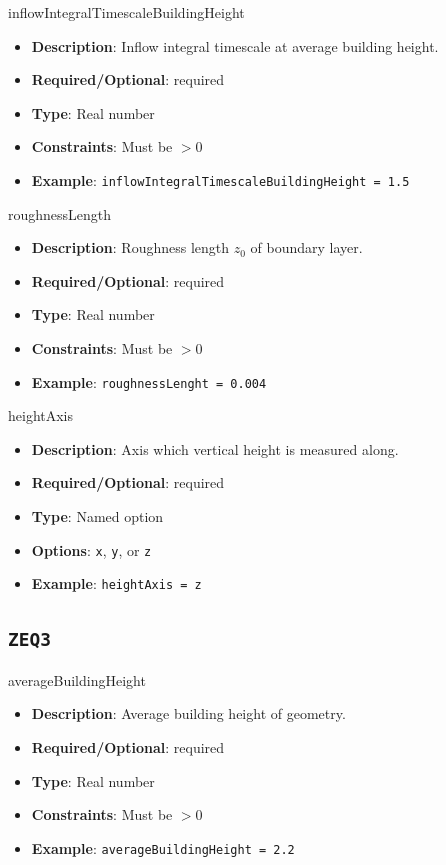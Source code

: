 inflowIntegralTimescaleBuildingHeight
\vspace{\the\parameterListSpacing}
\begin{itemize}
    \item {\bf Description}: Inflow integral timescale at average building height.
    \item {\bf Required/Optional}: required
    \item {\bf Type}: Real number
    \item {\bf Constraints}: Must be $>0$
    \item {\bf Example}: \lstinline!inflowIntegralTimescaleBuildingHeight = 1.5!
\end{itemize}

roughnessLength
\vspace{\the\parameterListSpacing}
\begin{itemize}
    \item {\bf Description}: Roughness length $z_0$ of boundary layer.
    \item {\bf Required/Optional}: required
    \item {\bf Type}: Real number
    \item {\bf Constraints}: Must be $>0$
    \item {\bf Example}: \lstinline!roughnessLenght = 0.004!
\end{itemize}

heightAxis
\vspace{\the\parameterListSpacing}
\begin{itemize}
    \item {\bf Description}: Axis which vertical height is measured along.
    \item {\bf Required/Optional}: required
    \item {\bf Type}: Named option
    \item {\bf Options}: \lstinline!x!, \lstinline!y!, or \lstinline!z!
    \item {\bf Example}: \lstinline!heightAxis = z!
\end{itemize}


\newpage
\subsection*{\lstinline!ZEQ3!}
averageBuildingHeight
\vspace{\the\parameterListSpacing}
\begin{itemize}
    \item {\bf Description}: Average building height of geometry.
    \item {\bf Required/Optional}: required
    \item {\bf Type}: Real number
    \item {\bf Constraints}: Must be $>0$
    \item {\bf Example}: \lstinline!averageBuildingHeight = 2.2!
\end{itemize}

